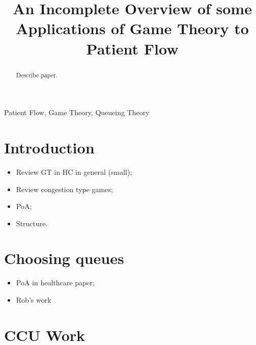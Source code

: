 \documentclass[a4paper,11pt]{article}
\title{An Incomplete Overview of some Applications of Game Theory to Patient Flow}
\begin{document}
\maketitle

\author{
}

\author{
}

\author{
}

\author{
}

\vspace{8mm}

\begin{abstract}
Describe paper.
\end{abstract}

\bigskip
\begin{keywords}
Patient Flow, Game Theory, Queueing Theory

\bigskip
{}
\end{keywords}


\newpage

\section{Introduction}

\begin{itemize}
    \item Review GT in HC in general (small);
    \item Review congestion type games;
    \item PoA;
    \item Structure.
\end{itemize}

\section{Choosing queues}

\begin{itemize}
    \item PoA in healthcare paper;
    \item Rob's work
\end{itemize}

\section{CCU Work}
\end{document}
